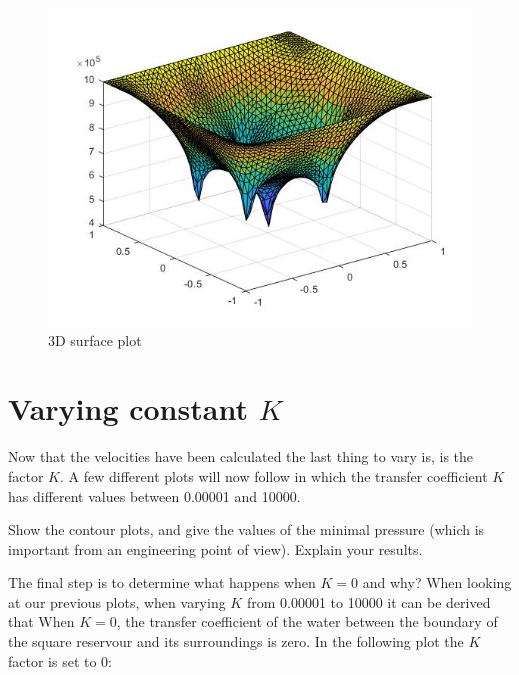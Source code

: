 \documentclass[a4paper]{report}
\begin{document}
\begin{figure}[ht!]
	\centering
	\includegraphics[width=130mm]{3Dv.jpg}
	\caption{3D surface plot
	\label{overflow}}
\end{figure}
\vfill
\newpage
\section{Varying constant $K$}

Now that the velocities have been calculated the last thing to vary is, is the factor $K$. A few different plots will now follow in which the transfer coefficient $K$ has different values between 0.00001 and 10000. 





Show the contour plots, and give the values of the minimal pressure (which is important from an engineering point of view). Explain your results.







The final step is to determine what happens when $K=0$ and why? When looking at our previous plots, when varying $K$ from 0.00001 to 10000 it can be derived that When $K=0$, the transfer coefficient of the water between the boundary of the square reservour and its surroundings is zero. In the following plot the $K$ factor is set to 0:


\newpage

\appendix
\end{document}
